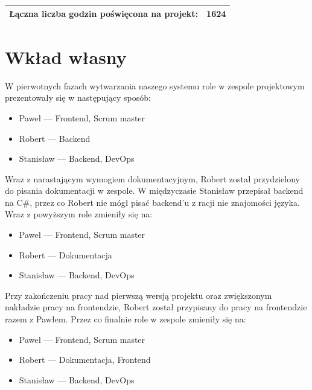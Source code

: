 \documentclass[a4paper,11pt]{report}
\begin{document}
\begin{tabular}{|l|l|}
\hline
Łączna liczba godzin poświęcona na projekt: & 1624\\
\hline
\end{tabular}



\chapter {Wkład własny}
W pierwotnych fazach wytwarzania naszego systemu role w zespole projektowym prezentowały się w następujący sposób:
\begin{itemize}
	\item Paweł — Frontend, Scrum master
	\item Robert — Backend
	\item Stanisław — Backend, DevOps
\end{itemize}
Wraz z narastającym wymogiem dokumentacyjnym, Robert został przydzielony do pisania dokumentacji w zespole.
W międzyczasie Stanisław przepisał backend na C\#, przez co Robert nie mógł pisać backend'u z racji nie znajomości języka.
Wraz z powyższym role zmieniły się na:
\begin{itemize}
	\item Paweł — Frontend, Scrum master
	\item Robert — Dokumentacja
	\item Stanisław — Backend, DevOps
\end{itemize}
Przy zakończeniu pracy nad pierwszą wersją projektu oraz zwiększonym nakładzie pracy na frontendzie, Robert został przypisany do pracy na frontendzie razem z Pawłem.
Przez co finalnie role w zespole zmieniły się na:
\begin{itemize}
	\item Paweł — Frontend, Scrum master
	\item Robert — Dokumentacja, Frontend
	\item Stanisław — Backend, DevOps
\end{itemize}
\end{document}
